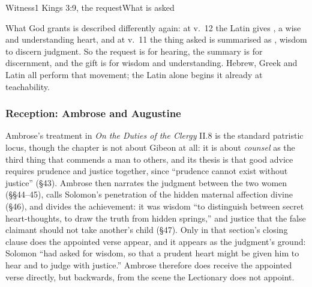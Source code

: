 \begin{threecoltable}{Witness}{1 Kings 3:9, the request}{What is asked}
\end{threecoltable}

What God grants is described differently again: at v.~12 the Latin gives , a wise and understanding heart, and at v.~11 the thing asked is summarised as , wisdom to discern judgment. So the request is for hearing, the summary is for discernment, and the gift is for wisdom and understanding. Hebrew, Greek and Latin all perform that movement; the Latin alone begins it already at teachability.

\subsubsection*{Reception: Ambrose and Augustine}

Ambrose's treatment in \emph{On the Duties of the Clergy} II.8 is the standard patristic locus, though the chapter is not about Gibeon at all: it is about \emph{counsel} as the third thing that commends a man to others, and its thesis is that good advice requires prudence and justice together, since ``prudence cannot exist without justice'' (§43). Ambrose then narrates the judgment between the two women (§§44--45), calls Solomon's penetration of the hidden maternal affection divine (§46), and divides the achievement: it was wisdom ``to distinguish between secret heart-thoughts, to draw the truth from hidden springs,'' and justice that the false claimant should not take another's child (§47). Only in that section's closing clause does the appointed verse appear, and it appears as the judgment's ground: Solomon ``had asked for wisdom, so that a prudent heart might be given him to hear and to judge with justice.'' Ambrose therefore does receive the appointed verse directly, but backwards, from the scene the Lectionary does not appoint.

